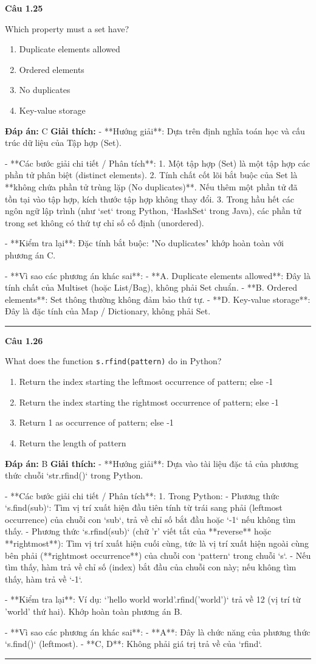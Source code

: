 \documentclass[11pt,a4paper]{article}
\newenvironment{question}[1]{%
  \par\vspace{1em}\noindent\textbf{\large Câu #1}\par\vspace{0.4em}
}{%
  \par\vspace{1em}\hrule\vspace{0.6em}
}
\newenvironment{choices}{%
  \begin{enumerate}[label=\textbf{\Alph*.},leftmargin=2.2em,itemsep=2pt,topsep=3pt]
}{%
  \end{enumerate}
}
\newcommand{\choice}{\item}
\begin{document}
\begin{question}{1.25}
Which property must a set have?
\begin{choices}
\choice Duplicate elements allowed
\choice Ordered elements
\choice No duplicates
\choice Key-value storage
\end{choices}
\textbf{Đáp án:} C
\textbf{Giải thích:} - **Hướng giải**:
  Dựa trên định nghĩa toán học và cấu trúc dữ liệu của Tập hợp (Set).

- **Các bước giải chi tiết / Phân tích**:
  1. Một tập hợp (Set) là một tập hợp các phần tử phân biệt (distinct elements).
  2. Tính chất cốt lõi bắt buộc của Set là **không chứa phần tử trùng lặp (No duplicates)**. Nếu thêm một phần tử đã tồn tại vào tập hợp, kích thước tập hợp không thay đổi.
  3. Trong hầu hết các ngôn ngữ lập trình (như `set` trong Python, `HashSet` trong Java), các phần tử trong set không có thứ tự chỉ số cố định (unordered).

- **Kiểm tra lại**:
  Đặc tính bắt buộc: "No duplicates" khớp hoàn toàn với phương án C.

- **Vì sao các phương án khác sai**:
  - **A. Duplicate elements allowed**: Đây là tính chất của Multiset (hoặc List/Bag), không phải Set chuẩn.
  - **B. Ordered elements**: Set thông thường không đảm bảo thứ tự.
  - **D. Key-value storage**: Đây là đặc tính của Map / Dictionary, không phải Set.
\end{question}

\begin{question}{1.26}
What does the function \texttt{s.rfind(pattern)} do in Python?
\begin{choices}
\choice Return the index starting the leftmost occurrence of pattern; else -1
\choice Return the index starting the rightmost occurrence of pattern; else -1
\choice Return 1 as occurrence of pattern; else -1
\choice Return the length of pattern
\end{choices}
\textbf{Đáp án:} B
\textbf{Giải thích:} - **Hướng giải**:
  Dựa vào tài liệu đặc tả của phương thức chuỗi `str.rfind()` trong Python.

- **Các bước giải chi tiết / Phân tích**:
  1. Trong Python:
     - Phương thức `s.find(sub)`: Tìm vị trí xuất hiện đầu tiên tính từ trái sang phải (leftmost occurrence) của chuỗi con `sub`, trả về chỉ số bắt đầu hoặc `-1` nếu không tìm thấy.
     - Phương thức `s.rfind(sub)` (chữ 'r' viết tắt của **reverse** hoặc **rightmost**): Tìm vị trí xuất hiện cuối cùng, tức là vị trí xuất hiện ngoài cùng bên phải (**rightmost occurrence**) của chuỗi con `pattern` trong chuỗi `s`.
     - Nếu tìm thấy, hàm trả về chỉ số (index) bắt đầu của chuỗi con này; nếu không tìm thấy, hàm trả về `-1`.

- **Kiểm tra lại**:
  Ví dụ: `'hello world world'.rfind('world')` trả về 12 (vị trí từ 'world' thứ hai). Khớp hoàn toàn phương án B.

- **Vì sao các phương án khác sai**:
  - **A**: Đây là chức năng của phương thức `s.find()` (leftmost).
  - **C, D**: Không phải giá trị trả về của `rfind`.
\end{question}
\end{document}
